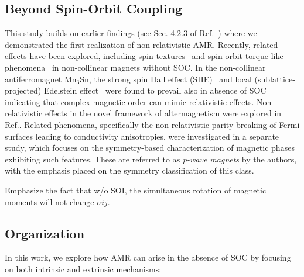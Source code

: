 \documentclass[prb,showpacs,amsmath,amssymb,superscriptaddress,twocolumn,floatfix]{revtex4-1}
\begin{document}
\subsection{Beyond Spin-Orbit Coupling}

This study builds on earlier findings (see Sec. 4.2.3 of Ref.~\cite{Ritzinger:2023}) where we demonstrated the first realization of non-relativistic AMR. Recently, related effects have been explored, including spin textures~\cite{Bonbien:2022} and spin-orbit-torque-like phenomena~\cite{Gonzalez-Hernandez:2024} in non-collinear magnets without SOC. In the non-collinear antiferromagnet Mn$_3$Sn, the strong spin Hall effect (SHE)~\cite{Zhou:2020, Zhang:2017} and local (sublattice-projected) Edelstein effect~\cite{Gonzalez-Hernandez:2024} were found to prevail also in absence of SOC~\cite{Manna:2018, Gonzalez-Hernandez:2024} indicating that complex magnetic order can mimic relativistic effects. Non-relativistic effects in the novel framework of altermagnetism were explored in Ref.\cite{Jungwirth:2024}. Related phenomena, specifically the non-relativistic parity-breaking of Fermi surfaces leading to conductivity anisotropies, were investigated in a separate study\cite{BirkHellens:2023}, which focuses on the symmetry-based characterization of magnetic phases exhibiting such features. These are referred to as \textit{p-wave magnets} by the authors, with the emphasis placed on the symmetry classification of this class.

{\color{red} Emphasize the fact that w/o SOI, the simultaneous
  rotation of magnetic moments will not change $\sigma{ij}$.}

\subsection{Organization}

In this work, we explore how AMR can arise in the absence of SOC by focusing on both intrinsic and extrinsic mechanisms: 
\end{document}
